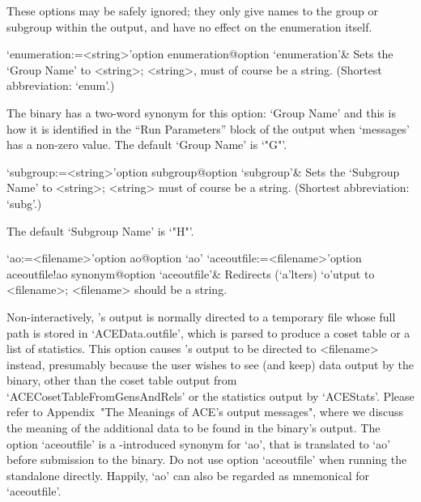 \enditems


These options may be safely ignored; they only give names to the group
or subgroup within the {\ACE}  output,  and  have  no  effect  on  the
enumeration itself.

\beginitems

\>`enumeration:=<string>'{option enumeration}@{option `enumeration'}&
Sets the `Group Name' to <string>;  <string>,  must  of  course  be  a
string. (Shortest abbreviation: `enum'.)

The {\ACE} binary has a two-word synonym for this option: `Group Name'
and this is how it is identified in the ``Run  Parameters''  block  of
the {\ACE} output when `messages' has a non-zero  value.  The  default
`Group Name' is `"G"'.

\>`subgroup:=<string>'{option subgroup}@{option `subgroup'}& 
Sets the `Subgroup Name' to <string>; <string> must  of  course  be  a
string. (Shortest abbreviation: `subg'.)

The default `Subgroup Name' is `"H"'.

\enditems


\beginitems

\>`ao:=<filename>'{option ao}@{option `ao'}
\>`aceoutfile:=<filename>'{option aceoutfile!ao synonym}@{option `aceoutfile'}&
Redirects (`a'lters) `o'utput to <filename>; <filename>  should  be  a
string.

Non-interactively, {\ACE}'s output is normally directed to a temporary
file whose full path is stored in `ACEData.outfile', which  is  parsed
to produce a coset table or a list of statistics. This  option  causes
{\ACE}'s output to  be  directed  to  <filename>  instead,  presumably
because the user wishes to see (and keep) data output  by  the  {\ACE}
binary,    other    than    the    coset     table     output     from
`ACECosetTableFromGensAndRels' or the statistics output by `ACEStats'.
Please refer to Appendix~"The  Meanings  of  ACE's  output  messages",
where we discuss the meaning of the additional data to be found in the
{\ACE} binary's output. The option `aceoutfile' is a {\GAP}-introduced
synonym for `ao', that is translated to `ao' before submission to  the
{\ACE} binary.  Do  not  use  option  `aceoutfile'  when  running  the
standalone directly. Happily, `ao' can also be regarded as  mnemonical
for `aceoutfile'.

